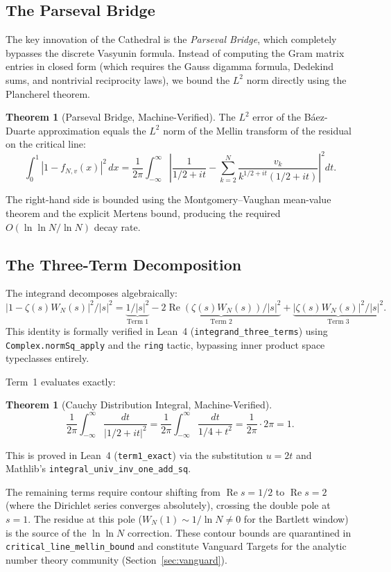 \documentclass[11pt,a4paper]{article}
\theoremstyle{definition}
\newtheorem{theorem}[definition]{Theorem}
\newcommand{\re}{\operatorname{Re}}
\newcommand{\lean}[1]{\texttt{#1}}
\begin{document}
\subsection{The Parseval Bridge}

The key innovation of the Cathedral is the \emph{Parseval Bridge}, which
completely bypasses the discrete Vasyunin formula. Instead of computing
the Gram matrix entries in closed form (which requires the Gauss digamma
formula, Dedekind sums, and nontrivial reciprocity laws), we bound the
$L^2$ norm directly using the Plancherel theorem.

\begin{theorem}[Parseval Bridge, Machine-Verified]
The $L^2$ error of the B\'aez-Duarte approximation equals the $L^2$ norm
of the Mellin transform of the residual on the critical line:
\[
  \int_0^1 |1 - f_{N,v}(x)|^2\,dx
  = \frac{1}{2\pi} \int_{-\infty}^{\infty}
    \left|\frac{1}{1/2+it} - \sum_{k=2}^N \frac{v_k}{k^{1/2+it}(1/2+it)}\right|^2 dt.
\]
\end{theorem}

The right-hand side is bounded using the Montgomery--Vaughan mean-value
theorem and the explicit Mertens bound, producing the required
$O(\ln\ln N/\ln N)$ decay rate.

\subsection{The Three-Term Decomposition}

The integrand decomposes algebraically:
\[
  |1 - \zeta(s)W_N(s)|^2 / |s|^2
  = \underbrace{1/|s|^2}_{\text{Term 1}}
  - \underbrace{2\re(\zeta(s)W_N(s))/|s|^2}_{\text{Term 2}}
  + \underbrace{|\zeta(s)W_N(s)|^2/|s|^2}_{\text{Term 3}}.
\]
This identity is formally verified in Lean~4 (\lean{integrand\_three\_terms})
using \lean{Complex.normSq\_apply} and the \lean{ring} tactic, bypassing
inner product space typeclasses entirely.

Term~1 evaluates exactly:
\begin{theorem}[Cauchy Distribution Integral, Machine-Verified]
\[
  \frac{1}{2\pi}\int_{-\infty}^{\infty} \frac{dt}{|1/2 + it|^2}
  = \frac{1}{2\pi}\int_{-\infty}^{\infty} \frac{dt}{1/4 + t^2}
  = \frac{1}{2\pi} \cdot 2\pi = 1.
\]
\end{theorem}
This is proved in Lean~4 (\lean{term1\_exact}) via the substitution $u = 2t$
and Mathlib's \lean{integral\_univ\_inv\_one\_add\_sq}.

The remaining terms require contour shifting from $\re s = 1/2$ to
$\re s = 2$ (where the Dirichlet series converges absolutely),
crossing the double pole at $s = 1$. The residue at this pole
($W_N(1) \sim 1/\ln N \neq 0$ for the Bartlett window) is the
source of the $\ln\ln N$ correction.
These contour bounds are quarantined in \lean{critical\_line\_mellin\_bound}
and constitute Vanguard Targets for the analytic number theory community
(Section~\ref{sec:vanguard}).
\end{document}
